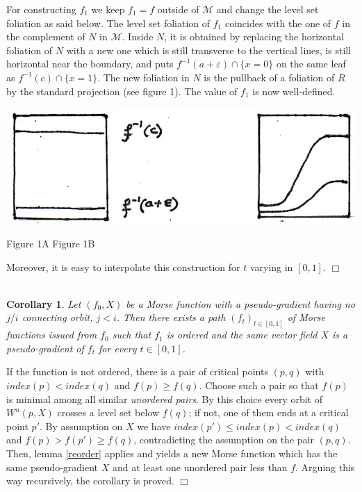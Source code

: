 \documentclass[12pt]{amsart}
\newtheorem{cor}[thm]{Corollary}
\def\ep{\varepsilon}
\def\nd{\noindent}
\def\bull{\hfill$\Box$\\}
\def\proof{\nd {\bf Proof.\ }}
\begin{document}
For constructing $f_1$ we keep $f_1=f$ outside of $\mathcal M $ and change the level set foliation
as said below. The level set foliation of $f_1$ coincides with the one of $f$ 
in the complement of $N$ in $\mathcal M$. Inside  $N$,
it is obtained by  replacing the horizontal foliation of $N$ with a new one
which is still transverse to the vertical lines, %
 is still horizontal near the boundary,
and puts $f^{-1}(a+\ep)\cap \{x=0\}$ on the same leaf as $f^{-1}(c)\cap \{x=1\}$. The new foliation in $N$
 is the pullback of a foliation of $R$ by the standard projection  
(see figure 1). 
The value of $f_1$ is now well-defined. %
\begin{center}
\hskip 0cm \includegraphics[scale=0.6]{reidemeister1-084.jpg}
\centerline{Figure 1A \hskip 4cm Figure 1B}
\end{center}
Moreover, it is easy to interpolate
this construction for $t$ varying in $[0,1]$. \bull\\


\begin{cor} \label{reordering_0}Let $(f_0,X)$ be a Morse function with a pseudo-gradient
having no $j/i$ connecting orbit, $j<i$. 
Then there exists a path $(f_t)_{t\in[0,1]}$ of Morse functions issued from
$f_0$  such that $f_1$
is ordered and the same vector field $X$ is a pseudo-gradient of $f_t$ for every $t\in [0,1]$.
\end{cor}


\medskip

\proof %
If the function is not ordered,
there is a pair of critical points $(p, q)$ with $index(p)<index(q)$ %
and $f(p)\geq f(q)$.
Choose such a pair  so that $f(p)$  %
is  minimal among all similar %
{\it unordered pairs}. By this choice every orbit of  $W^u(p, X)$ crosses a level set 
below $f(q)$; if not, one of them  ends at a critical point $p'$. By assumption on $X$ we have
$index(p')\leq index(p)<index(q)$
and  $f(p)>f(p')\geq f(q)$,
 contradicting the assumption on the pair 
$(p,q)$. Then, lemma \ref{reorder} applies and yields a new Morse function 
which has the same pseudo-gradient $X$ and  at least one unordered  pair less than $f$.
Arguing this way recursively, the corollary is proved.
\bull
\end{document}
